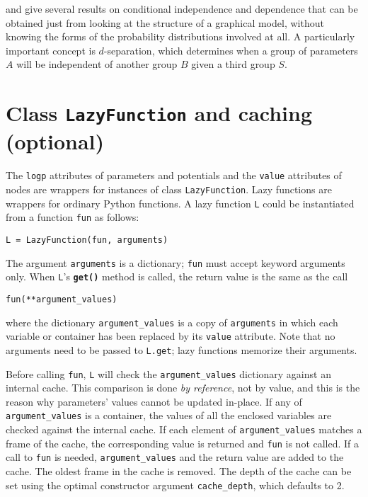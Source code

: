 \cite{dawidmarkov} and \cite{jordangraphical} give several results on conditional independence and dependence that can be obtained just from looking at the structure of a graphical model, without knowing the forms of the probability distributions involved at all. A particularly important concept is $d$-separation, which determines when a group of parameters $A$ will be independent of another group $B$ given a third group $S$.

\section{Class \texttt{LazyFunction} and caching (optional)}

The \texttt{logp} attributes of parameters and potentials and the \texttt{value} attributes of nodes are wrappers for instances of class \texttt{LazyFunction}. Lazy functions are wrappers for ordinary Python functions. A lazy function \texttt{L} could be instantiated from a function \texttt{fun} as follows:
\begin{verbatim}
L = LazyFunction(fun, arguments)
\end{verbatim}
The argument \texttt{arguments} is a dictionary; \texttt{fun} must accept keyword arguments only. When \texttt{L}'s \texttt{\bfseries get()} method is called, the return value is the same as the call 
\begin{verbatim}
fun(**argument_values)
\end{verbatim}
where the dictionary \texttt{argument\_values} is a copy of \texttt{arguments} in which each variable or container has been replaced by its \texttt{value} attribute. Note that no arguments need to be passed to \texttt{L.get}; lazy functions memorize their arguments.

Before calling \texttt{fun}, \texttt{L} will check the \texttt{argument\_values} dictionary against an internal cache. This comparison is done \emph{by reference}, not by value, and this is the reason why parameters' values cannot be updated in-place. If any of \texttt{argument\_values} is a container, the values of all the enclosed variables are checked against the internal cache. If each element of \texttt{argument\_values} matches a frame of the cache, the corresponding value is returned and \texttt{fun} is not called. If a call to \texttt{fun} is needed, \texttt{argument\_values} and the return value are added to the cache. The oldest frame in the cache is removed. The depth of the cache can be set using the optimal constructor argument \texttt{cache\_depth}, which defaults to 2.

